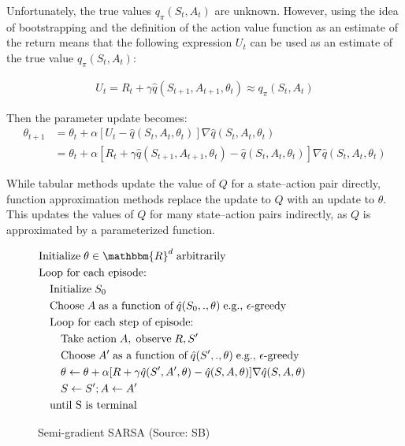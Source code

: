 Unfortunately, the true values $q_\pi(S_t, A_t)$ are unknown. However, using the idea of bootstrapping and the definition of the action value function as an estimate of the return means that the following expression $U_t$ can be used as an estimate of the true value $q_\pi(S_t, A_t)$: 

\begin{align*}
U_t = R_t + \gamma \hat{q}(S_{t+1}, A_{t+1}, \theta_t) \approx q_\pi(S_t, A_t)
\end{align*}

Then the parameter update becomes:
\begin{align}
\theta_{t+1} &= \theta_t + \alpha \left[ U_t - \hat{q}(S_t, A_t, \theta_t)\right] \nabla \hat{q}(S_t, A_t, \theta_t) \label{eq:dqnupdate} \\
 &= \theta_t + \alpha \left[ R_t + \gamma \hat{q}(S_{t+1}, A_{t+1}, \theta_t) - \hat{q}(S_t, A_t, \theta_t)\right] \nabla \hat{q}(S_t, A_t, \theta_t) \nonumber
\end{align}

\begin{alertbox}
While tabular methods update the value of $Q$ for a state--action pair directly, function approximation methods replace the update to $Q$ with an update to $\theta$. This updates the values of $Q$ for many state--action pairs indirectly, as $Q$ is approximated by a parameterized function.
\end{alertbox}

\begin{figure}
\small
\begin{pseudocodebox}
\vspace{-\baselineskip}
\begin{align*}
& \text{Initialize}\; \theta \in \mathbbm{R}^d \; \text{arbitrarily} \\
& \text{Loop for each episode:} \\
& \quad \text{Initialize}\; S_0 \\
& \quad \text{Choose}\; A \; \text{as a function of}\; \hat{q}(S_0, ., \theta) \; \text{e.g., $\epsilon$-greedy} \\ 
& \quad \text{Loop for each step of episode:} \\
& \quad \quad \text{Take action}\; A, \; \text{observe} \; R, S' \\
& \quad \quad \text{Choose}\; A' \; \text{as a function of}\; \hat{q}(S', ., \theta) \; \text{e.g., $\epsilon$-greedy} \\ 
& \quad \quad \theta \leftarrow \theta + \alpha [R + \gamma \hat{q}(S', A', \theta) - \hat{q}(S, A, \theta)] \nabla \hat{q}(S, A, \theta) \hspace{1in} \\
& \quad \quad S \leftarrow S'; A \leftarrow A'\\
& \quad \text{until S is terminal}
\end{align*}
\end{pseudocodebox}
\caption[Semi-gradient SARSA]{Semi-gradient SARSA (Source: SB)}
\label{fig:gradientsarsa}
\end{figure}

